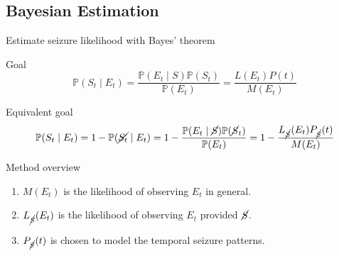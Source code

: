 \documentclass[t]{beamer}
\theoremstyle{definition}
\begin{document}
\subsection{Bayesian Estimation}
\begin{frame}{Estimate seizure likelihood with Bayes' theorem}
    
    \begin{alertblock}{Goal}
        $$\mathbb{P}(S_t \mid E_t) = \frac{\mathbb{P}(E_t \mid S) \mathbb{P}(S_t)}{\mathbb{P}(E_t)} = \frac{L(E_t)P(t)}{M(E_t)}$$
    \end{alertblock}

    \pause
    \begin{block}{Equivalent goal}
        \vspace{-10}
        $$\mathbb{P}(S_t \mid E_t) = 1 - \mathbb{P}(\cancel{S_t} \mid E_t) = 1 - \frac{\mathbb{P}(E_t \mid \cancel{S}) \mathbb{P}(\cancel{S}_t)}{\mathbb{P}(E_t)} = 1 - \frac{L_{\cancel{S}}(E_t)P_{\cancel{S}}(t)}{M(E_t)}$$
    \end{block}

    \pause
    \begin{block}{Method overview}
        \begin{enumerate}[<+->]
            \item $M(E_t)$ is the likelihood of observing $E_t$ in general.
            \item $L_{\cancel{S}}(E_t)$ is the likelihood of observing $E_t$ provided $\cancel{S}$.
            \item $P_{\cancel{S}}(t)$ is chosen to model the temporal seizure patterns.
        \end{enumerate}
    \end{block}

\end{frame}
\end{document}
